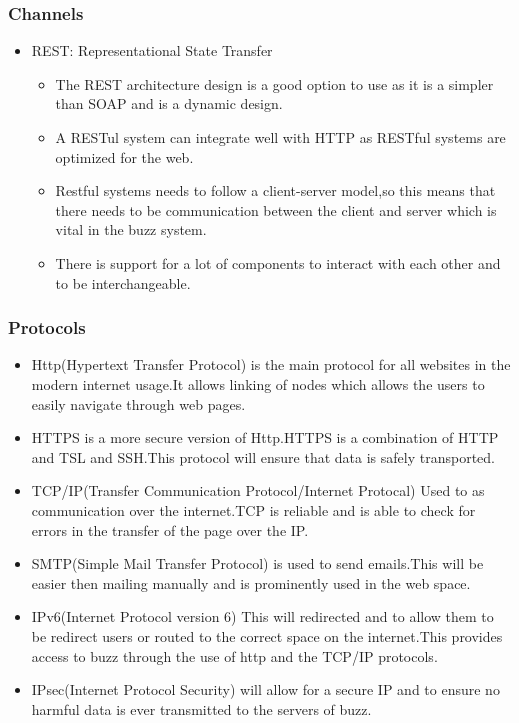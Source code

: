 
\subsubsection{Channels}
\begin{itemize}
\item REST: Representational State Transfer
\begin{itemize}
\item The REST architecture design is a good option to use as it is a simpler than SOAP and is a dynamic design.
\item A RESTul system can integrate well with HTTP as RESTful systems are optimized for the web.
\item Restful systems needs to follow a client-server model,so this means that there needs to be communication between the client and server which is vital in the buzz system.
\item There is support for a lot of components to interact with each other and to be interchangeable.
\end{itemize}
\end{itemize}
\subsubsection{Protocols}
\begin{itemize}
\item Http(Hypertext Transfer Protocol) is the main protocol for all websites in the modern internet usage.It allows linking of nodes which allows the users to easily navigate through web pages.
\item HTTPS is a more secure version of Http.HTTPS is a combination of HTTP and TSL and SSH.This protocol will ensure that data is safely transported.
\item TCP/IP(Transfer Communication Protocol/Internet Protocal) Used to as communication over the internet.TCP is reliable and is able to check for errors in the transfer of the page over the IP.
\item SMTP(Simple Mail Transfer Protocol) is used to send emails.This will be easier then mailing manually and is prominently used in the web space.
\item IPv6(Internet Protocol version 6) This will  redirected and to allow them to be redirect users or routed to the correct space on the internet.This provides access to buzz through the use of http and the TCP/IP protocols.
\item IPsec(Internet Protocol Security) will allow for a secure IP and to ensure no harmful data is ever transmitted to the servers of buzz.
\end{itemize}

